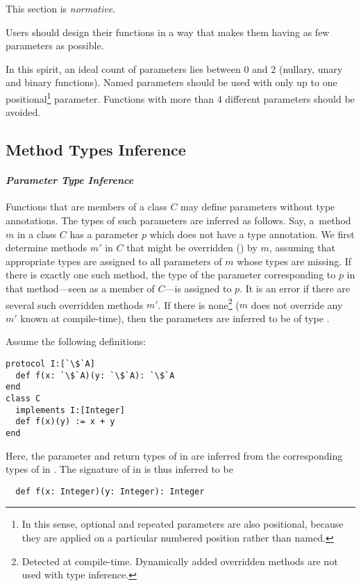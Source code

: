 This section is {\em normative}. 

Users should design their functions in a way that makes them having as few parameters as possible. 

In this spirit, an ideal count of parameters lies between 0 and 2 (nullary, unary and binary functions). Named parameters should be used with only up to one positional\footnote{In this sense, optional and repeated parameters are also positional, because they are applied on a particular numbered position rather than named.} parameter. Functions with more than 4 different parameters should be avoided. 

\subsection{Method Types Inference}
\label{sec:method-types-inference}

\paragraph{\em Parameter Type Inference}
Functions that are members of a class $C$ may define parameters without type annotations. The types of such parameters are inferred as follows. Say, a~method $m$ in a class $C$ has a parameter $p$ which does not have a type annotation. We first determine methods $m'$ in $C$ that might be overridden () by $m$, assuming that appropriate types are assigned to all parameters of $m$ whose types are missing. If there is exactly one such method, the type of the parameter corresponding to $p$ in that method---seen as a member of $C$---is assigned to $p$. It is an error if there are several such overridden methods $m'$. If there is none\footnote{Detected at compile-time. Dynamically added overridden methods are not used with type inference.} ($m$ does not override any $m'$ known at compile-time), then the parameters are inferred to be of type .

\example Assume the following definitions:
\begin{lstlisting}[escapechar=`]
protocol I:[`\$`A]
  def f(x: `\$`A)(y: `\$`A): `\$`A
end
class C
  implements I:[Integer]
  def f(x)(y) := x + y
end
\end{lstlisting}
Here, the parameter and return types of \lstinline@f@ in \lstinline@C@ are
inferred from the corresponding types of \lstinline@f@ in \lstinline@I@. The 
signature of \lstinline@f@ in \lstinline@C@ is thus inferred to be
\begin{lstlisting}
  def f(x: Integer)(y: Integer): Integer
\end{lstlisting}

